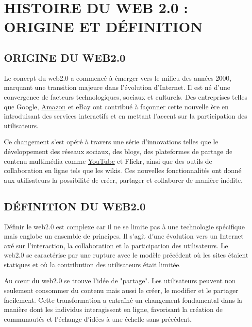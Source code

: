 \documentclass[12pt,a4paper]{article} %
\begin{document}
	\section{\textbf{HISTOIRE DU WEB 2.0 : ORIGINE ET DÉFINITION}}
	
	\subsection{\textbf{ORIGINE DU WEB2.0}}
	Le concept du web2.0 a commencé à émerger vers le milieu des années 2000, marquant une transition majeure dans l'évolution d'Internet. Il est né d'une convergence de facteurs technologiques, sociaux et culturels. Des entreprises telles que Google, \href{https://www.amazon.com.be/?tag=betxtabkgodef-21&ref=pd_sl_7q4ld6cerg_e&adgrpid=162532280388&hvpone=&hvptwo=&hvadid=675303268037&hvpos=&hvnetw=g&hvrand=3781438560409787019&hvqmt=e&hvdev=c&hvdvcmdl=&hvlocint=1001011&hvlocphy=1005402&hvtargid=kwd-10573980&hydadcr=24879_2326196&language=fr_BE}{Amazon} et eBay ont contribué à façonner cette nouvelle ère en introduisant des services interactifs et en mettant l'accent sur la participation des utilisateurs.
	
	Ce changement s'est opéré à travers une série d'innovations telles que le développement des réseaux sociaux, des blogs, des plateformes de partage de contenu multimédia comme \href{https://www.youtube.com/}{YouTube} et Flickr, ainsi que des outils de collaboration en ligne tels que les wikis. Ces nouvelles fonctionnalités ont donné aux utilisateurs la possibilité de créer, partager et collaborer de manière inédite.
	
	
	\subsection{\textbf{DÉFINITION DU WEB2.0}}
	Définir le web2.0 est complexe car il ne se limite pas à une technologie spécifique mais englobe un ensemble de principes. Il s'agit d'une évolution vers un Internet axé sur l'interaction, la collaboration et la participation des utilisateurs. Le web2.0 se caractérise par une rupture avec le modèle précédent où les sites étaient statiques et où la contribution des utilisateurs était limitée.
	
	Au cœur du web2.0 se trouve l'idée de "partage". Les utilisateurs peuvent non seulement consommer du contenu mais aussi le créer, le modifier et le partager facilement. Cette transformation a entraîné un changement fondamental dans la manière dont les individus interagissent en ligne, favorisant la création de communautés et l'échange d'idées à une échelle sans précédent.
	
\end{document}
